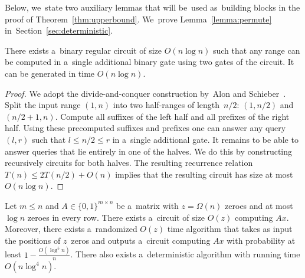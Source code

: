 \documentclass{toc}
\begin{document}
Below, we~state two auxiliary lemmas that will
be~used as~building blocks in the proof of Theorem~\ref{thm:upperbound}.
We~prove Lemma~\ref{lemma:permute}
in~Section~\ref{sec:deterministic}.



\begin{lemma}\label{lemma:decompose}
There exists a~binary regular circuit of size $O(n\log n)$ such that
any range can be computed in a~single additional binary gate
using two gates of the circuit. It can be generated in time
$O(n\log n)$.
\end{lemma}

\begin{proof}%
	We adopt the divide-and-conquer construction by~Alon and
	Schieber~\cite{Alon87optimalpreprocessing}. Split the input range $(1,n)$ into
	two half-ranges of length~$n/2$:
	$(1,n/2)$ and $(n/2+1,n)$.
	Compute all suffixes of the left half and all prefixes of
	the right half.
	Using these precomputed suffixes and
	prefixes one can answer any query $(l,r)$ such that $l \le n/2
	\le r$ in a~single additional gate. It remains to be able to answer
	queries that lie entirely in one of the halves. We do this by
	constructing recursively circuits for both halves. The resulting
	recurrence relation $T(n) \le 2T(n/2)+O(n)$ implies that the
	resulting circuit has size at most $O(n\log n)$.
\end{proof}



\begin{lemma}\label{lemma:permute}
Let $m \le n$ and $A \in \{0,1\}^{m \times n}$
be a~matrix with $z=\Omega(n)$ zeroes and at most $\log n$ zeroes in every row.
There exists a~circuit of size $O(z)$ computing $Ax$. Moreover, there exists
a~randomized $O(z)$ time algorithm that takes as input the positions of
$z$~zeros and outputs a~circuit computing $Ax$ with probability at least
$1-\frac{O(\log^5n)}{n}$. There also exists a~deterministic algorithm with
running time $O(n\log^4n)$.
\end{lemma}
\end{document}
